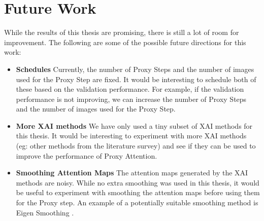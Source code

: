 \section{Future Work}
While the results of this thesis are promising, there is still a lot of room for improvement. The following are some of the possible future directions for this work:
\begin{itemize}
    \item \textbf{Schedules} Currently, the number of Proxy Steps and the number of images used for the Proxy Step are fixed. It would be interesting to schedule both of these based on the validation performance. For example, if the validation performance is not improving, we can increase the number of Proxy Steps and the number of images used for the Proxy Step.
    \item \textbf{More XAI methods} We have only used a tiny subset of XAI methods for this thesis. It would be interesting to experiment with more XAI methods (eg: other methods from the literature survey) and see if they can be used to improve the performance of Proxy Attention.
    \item \textbf{Smoothing Attention Maps} The attention maps generated by the XAI methods are noisy. While no extra smoothing was used in this thesis, it would be useful to experiment with smoothing the attention maps before using them for the Proxy step. An example of a potentially suitable smoothing method is Eigen Smoothing \cite{jacobPyTorchLibraryCAM2021}.
\end{itemize}
